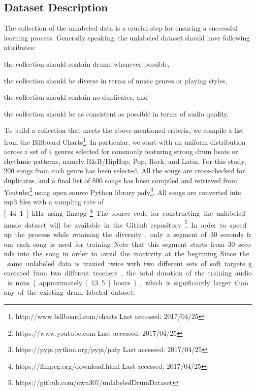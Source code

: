 \documentclass{article}
\begin{document}
\subsection{Dataset Description}
The collection of the unlabeled data is a crucial step for ensuring a successful learning process. Generally speaking, the unlabeled dataset should have following attributes: 
\begin{inparaenum}[(i)]
    \item   the collection should contain drums whenever possible,
    \item   the collection should be diverse in terms of music genres or playing styles,
    \item   the collection should contain no duplicates, and
    \item   the collection should be as consistent as possible in terms of audio quality. 
\end{inparaenum}
To build a collection that meets the above-mentioned criteria, we compile a list from the Billboard Charts\footnote{http://www.billboard.com/charts Last accessed: 2017/04/25}. In particular, we start with an uniform distribution across a set of 4 genres selected for commonly featuring strong drum beats or rhythmic patterns, namely R\&B$\slash$HipHop, Pop, Rock, and Latin. For this study, 200 songs from each genre has been selected. All the songs are cross-checked for duplicates, and a final list of 800 songs has been compiled and retrieved from Youtube\footnote{https://www.youtube.com Last accessed: 2017/04/25} using open source Python library pafy\footnote{https://pypi.python.org/pypi/pafy Last accessed: 2017/04/25}. All songs are converted into mp3 files with a sampling rate of \unit[44.1]{kHz} using ffmepg\footnote{https://ffmpeg.org/download.html Last accessed: 2017/04/25}. The source code for constructing the unlabeled music dataset will be available in the Github repository\footnote{https://github.com/cwu307/unlabeledDrumDataset}. In order to speed up the process while retaining the diversity, only a segment of 30 seconds from each song is used for training. Note that this segment starts from 30 seconds into the song in order to avoid the inactivity at the beginning. Since the same unlabeled data is trained twice with two different sets of soft targets generated from two different teachers, the total duration of the training audio is \unit[800]{mins} (approximately \unit[13.5]{hours}), which is significantly larger than any of the existing drum labeled dataset. 
\end{document}
